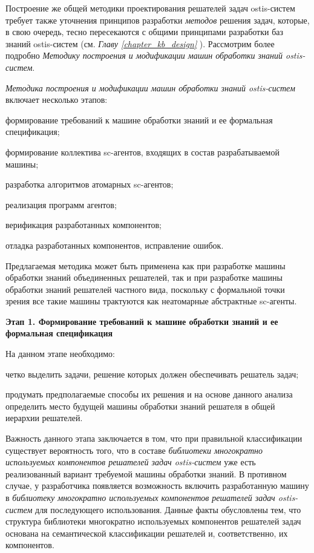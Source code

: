 Построение же общей методики проектирования решателей задач ostis-систем требует также уточнения принципов разработки \textit{методов} решения задач, которые, в свою очередь, тесно пересекаются с общими принципами разработки баз знаний ostis-систем (см. \textit{Главу \ref{chapter_kb_design} }). Рассмотрим более подробно \textit{Методику построения и модификации машин обработки знаний ostis-систем}.

\textit{Методика построения и модификации машин обработки знаний ostis-систем} включает несколько этапов:
\begin{textitemize}
    \item формирование требований к машине обработки знаний и ее формальная спецификация;
    \item формирование коллектива sc-агентов, входящих в состав разрабатываемой машины;
    \item разработка алгоритмов атомарных sc-агентов;
    \item реализация программ агентов;
    \item верификация разработанных компонентов;
    \item отладка разработанных компонентов, исправление ошибок.
\end{textitemize}

Предлагаемая методика может быть применена как при разработке машины обработки знаний объединенных решателей, так и при разработке машины обработки знаний решателей частного вида, поскольку с формальной точки зрения все такие машины трактуются как неатомарные абстрактные sc-агенты.

\textbf{Этап 1. Формирование требований к машине обработки знаний и ее формальная спецификация}

На данном этапе необходимо:
\begin{textitemize}
\item четко выделить задачи, решение которых должен обеспечивать решатель задач;
\item продумать предполагаемые способы их решения и на основе данного анализа определить место будущей машины обработки знаний решателя в общей иерархии решателей.
\end{textitemize}

Важность данного этапа заключается в том, что при правильной классификации существует вероятность того, что в составе \textit{библиотеки многократно используемых компонентов решателей задач ostis-систем} уже есть реализованный вариант требуемой машины обработки знаний. В противном случае, у разработчика появляется возможность включить разработанную машину в \textit{библиотеку многократно используемых компонентов решателей задач ostis-систем} для последующего использования. Данные факты обусловлены тем, что структура библиотеки многократно используемых компонентов решателей задач основана на семантической классификации решателей и, соответственно, их компонентов.

